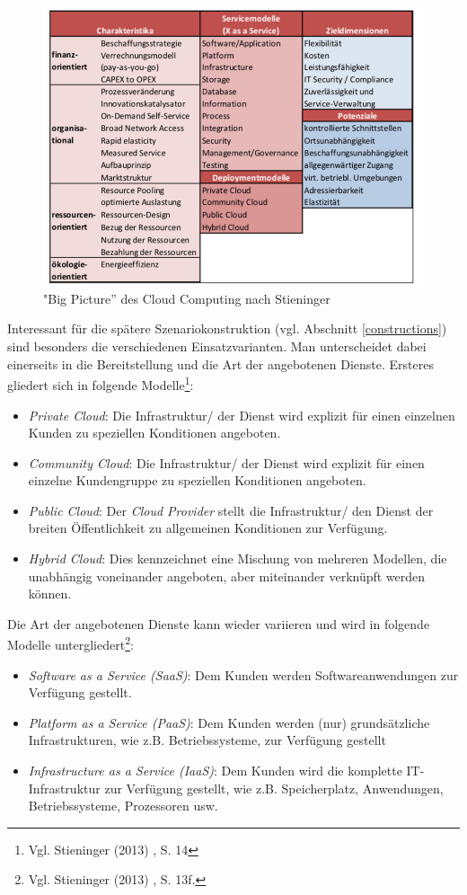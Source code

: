 \begin{figure}
	\centering
	\includegraphics[width=\linewidth]{images/bigpicture}
	\caption[Caption for parameters]{ "Big Picture'' des Cloud Computing nach Stieninger \cite{stieninger}}
	\label{fig:bigpicture}
\end{figure}

Interessant für die spätere Szenariokonstruktion (vgl. Abschnitt \ref{constructions}) sind besonders die verschiedenen Einsatzvarianten. Man unterscheidet dabei einerseits in die Bereitstellung und die Art der angebotenen Dienste. Ersteres gliedert sich in folgende Modelle\footnote{Vgl. Stieninger (2013) \cite{stieninger}, S. 14}:
\begin{itemize}
	\item \textit{Private Cloud}: Die Infrastruktur/ der Dienst wird explizit für einen einzelnen Kunden zu speziellen Konditionen angeboten.
	\item \textit{Community Cloud}: Die Infrastruktur/ der Dienst wird explizit für einen einzelne Kundengruppe zu speziellen Konditionen angeboten.
	\item \textit{Public Cloud}: Der \textit{Cloud Provider} stellt die Infrastruktur/ den Dienst der breiten Öffentlichkeit zu allgemeinen Konditionen zur Verfügung.
	\item \textit{Hybrid Cloud}: Dies kennzeichnet eine Mischung von mehreren Modellen, die unabhängig voneinander angeboten, aber miteinander verknüpft werden können.
\end{itemize}

Die Art der angebotenen Dienste kann wieder variieren und wird in folgende Modelle untergliedert\footnote{Vgl. Stieninger (2013) \cite{stieninger}, S. 13f.}:
\begin{itemize}
	\item \textit{Software as a Service (SaaS)}: Dem Kunden werden Softwareanwendungen zur Verfügung gestellt.
	\item \textit{Platform as a Service (PaaS)}: Dem Kunden werden (nur) grundsätzliche Infrastrukturen, wie z.B. Betriebssysteme, zur Verfügung gestellt
	\item \textit{Infrastructure as a Service (IaaS)}: Dem Kunden wird die komplette IT-Infrastruktur zur Verfügung gestellt, wie z.B. Speicherplatz, Anwendungen, Betriebssysteme, Prozessoren usw.
\end{itemize}

